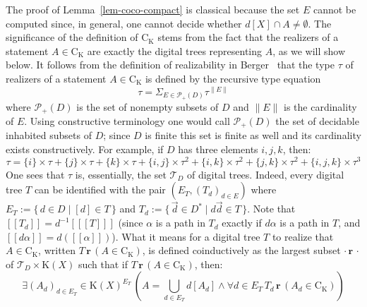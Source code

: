 \documentclass[microtype]{jloganal}
\theoremstyle{plain}
\theoremstyle{definition}
\newcommand{\TTT}{\mathcal{T}}
\newcommand{\coco}{\mathrm{C}}
\newcommand{\compact}{\mathrm{K}}
\newcommand{\val}[1]{[\![#1]\!]}
\newcommand{\card}[1]{\mathopen\parallel #1 \mathclose\parallel}
\newcommand{\rea}[2]{#1\,\mathbf{r}\,#2}
\newcommand{\powplus}{\mathcal{P}_{+}}
\newcommand{\branches}[1]{E_{#1}}
\newcommand{\subtree}[2]{#1_{#2}}
\begin{document}
The proof of Lemma~\ref{lem-coco-compact} is classical because the set
$E$ cannot be computed since, in general, one cannot decide whether 
$d[X]\cap A\neq\emptyset$.
The significance of the definition of $\coco_{\compact}$ stems from the 
fact that the realizers of a statement $A\in\coco_{\compact}$ are 
exactly the digital trees representing $A$, as we will show below. 
It follows from the definition of realizability in Berger~\cite{Berger11}
that the type $\tau$ of realizers of a statement $A\in\coco_{\compact}$ 
is defined by the recursive type equation
\[ \tau = \Sigma_{E\in\powplus(D)} \tau^{\card{E}} \] 
where $\powplus(D)$ is the set of nonempty subsets of $D$ and $\card{E}$ is the 
cardinality of $E$. Using 
constructive terminology one would call $\powplus(D)$ the set of 
decidable inhabited subsets of $D$; since $D$ is finite this set is 
finite as well and its cardinality exists constructively.
For example, if $D$ has three elements $i,j,k$, then:
\[ \tau = \{i\}\times\tau +\{j\}\times\tau +\{k\}\times\tau +
\{i,j\}\times\tau^2 +\{i,k\}\times\tau^2 + \{j,k\}\times\tau^2 +
\{i,j,k\}\times\tau^3\]
One sees that $\tau$ is, essentially, the set $\TTT_D$ of digital
trees. Indeed, every digital tree $T$ can be identified with the pair
$(\branches{T},(\subtree{T}{d})_{d\in E})$ where 
$\branches{T} := \{\,d\in D\mid [d]\in T\,\}$ and
$\subtree{T}{d} := \{\,\vec{d}\in D^* \mid d\vec{d}\in T\,\}$. 
Note that $\val{\subtree{T}{d}} = d^{-1}[\val{T}]$ 
(since $\alpha$ is a path in $\subtree{T}{d}$ exactly if $d\alpha$ is a path in $T$,
and $\val{d\alpha} = d(\val{\alpha})$).
What it means for a digital tree $T$ to realize that 
$A\in\coco_{\compact}$, written $\rea{T}{(A\in\coco_{\compact})}$,
is defined coinductively as the largest subset $\rea{\cdot}{\cdot}$ of
$\TTT_D\times\compact(X)$ such that if
$\rea{T}{(A\in \coco_{\compact})}$, then:
\[ 
  \exists (A_d)_{d\in \branches{T}} \in \compact(X)^{\branches{T}} \, 
(A = \bigcup_{d\in \branches{T}} d[A_d] \land 
\forall d\in \branches{T}\,\rea{\subtree{T}{d}}{(A_d\in\coco_{\compact})})
\]
\end{document}
